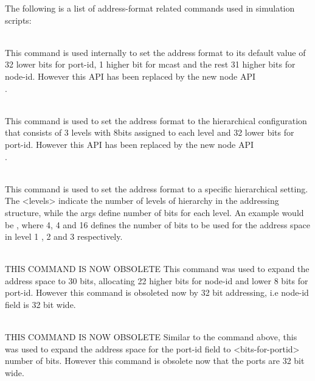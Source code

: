 The following is a list of address-format related commands used in simulation
scripts:
\begin{flushleft}
\\
This command is used internally to set the address format to its default value
of 32 lower bits for port-id, 1 higher bit for mcast and the rest 31 higher bits
for node-id. However this API has been replaced by the new node API\\
.


\\
This command is used to set the address format to the hierarchical configuration
that consists of 3 levels with 8bits assigned to each level and 32 lower bits
for port-id. However this API has been replaced by the new node API\\
.


\\
This command is used to set the address format to a specific hierarchical
setting. The <levels> indicate the number of levels of hierarchy in the addressing
structure, while the args define number of bits for each level. An example
would be  , where 4, 4 and
16 defines the number of bits to be used for the address space in level 1 , 2
and 3 respectively.


\\
THIS COMMAND IS NOW OBSOLETE
This command was used to expand the address space to 30 bits, allocating
22 higher bits for node-id and lower 8 bits for port-id. However this command
is obsoleted now by 32 bit addressing, i.e node-id field is 32 bit wide.


\\
THIS COMMAND IS NOW OBSOLETE
Similar to the command above, this was used to expand the address space for
the port-id field to <bits-for-portid> number of bits. However this command
is obsolete now that the ports are 32 bit wide.


\end{flushleft}
\endinput





